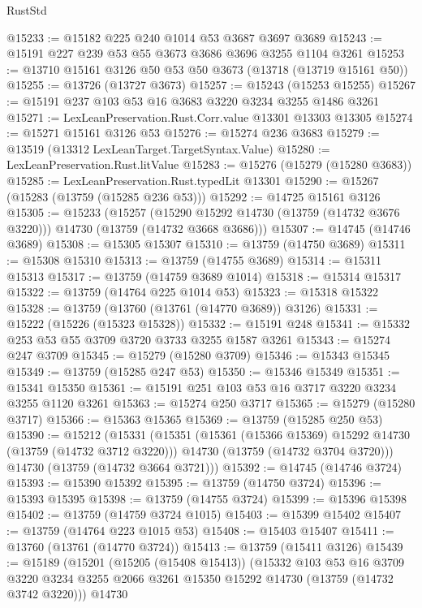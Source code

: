 \begin{lexlean}{RustStd}
\begin{coremodule}
@15233 := @15182 @225 @240 @1014 @53 @3687 @3697 @3689
@15243 := @15191 @227 @239 @53 @55 @3673 @3686 @3696 @3255 @1104 @3261
@15253 := @13710 @15161 @3126 @50 @53 @50 @3673 (@13718 (@13719 @15161 @50))
@15255 := @13726 (@13727 @3673)
@15257 := @15243 (@15253 @15255)
@15267 := @15191 @237 @103 @53 @16 @3683 @3220 @3234 @3255 @1486 @3261
@15271 := LexLeanPreservation.Rust.Corr.value @13301 @13303 @13305
@15274 := @15271 @15161 @3126 @53
@15276 := @15274 @236 @3683
@15279 := @13519 (@13312 LexLeanTarget.TargetSyntax.Value)
@15280 := LexLeanPreservation.Rust.litValue
@15283 := @15276 (@15279 (@15280 @3683))
@15285 := LexLeanPreservation.Rust.typedLit @13301
@15290 := @15267 (@15283 (@13759 (@15285 @236 @53)))
@15292 := @14725 @15161 @3126
@15305 := @15233
    (@15257
      (@15290 @15292 @14730 (@13759 (@14732 @3676 @3220)))
      @14730
      (@13759 (@14732 @3668 @3686)))
@15307 := @14745 (@14746 @3689)
@15308 := @15305 @15307
@15310 := @13759 (@14750 @3689)
@15311 := @15308 @15310
@15313 := @13759 (@14755 @3689)
@15314 := @15311 @15313
@15317 := @13759 (@14759 @3689 @1014)
@15318 := @15314 @15317
@15322 := @13759 (@14764 @225 @1014 @53)
@15323 := @15318 @15322
@15328 := @13759 (@13760 (@13761 (@14770 @3689)) @3126)
@15331 := @15222 (@15226 (@15323 @15328))
@15332 := @15191 @248
@15341 := @15332 @253 @53 @55 @3709 @3720 @3733 @3255 @1587 @3261
@15343 := @15274 @247 @3709
@15345 := @15279 (@15280 @3709)
@15346 := @15343 @15345
@15349 := @13759 (@15285 @247 @53)
@15350 := @15346 @15349
@15351 := @15341 @15350
@15361 := @15191 @251 @103 @53 @16 @3717 @3220 @3234 @3255 @1120 @3261
@15363 := @15274 @250 @3717
@15365 := @15279 (@15280 @3717)
@15366 := @15363 @15365
@15369 := @13759 (@15285 @250 @53)
@15390 := @15212
    (@15331
      (@15351
        (@15361 (@15366 @15369) @15292 @14730 (@13759 (@14732 @3712 @3220)))
        @14730
        (@13759 (@14732 @3704 @3720)))
      @14730
      (@13759 (@14732 @3664 @3721)))
@15392 := @14745 (@14746 @3724)
@15393 := @15390 @15392
@15395 := @13759 (@14750 @3724)
@15396 := @15393 @15395
@15398 := @13759 (@14755 @3724)
@15399 := @15396 @15398
@15402 := @13759 (@14759 @3724 @1015)
@15403 := @15399 @15402
@15407 := @13759 (@14764 @223 @1015 @53)
@15408 := @15403 @15407
@15411 := @13760 (@13761 (@14770 @3724))
@15413 := @13759 (@15411 @3126)
@15439 := @15189
    (@15201
      (@15205 (@15408 @15413))
      (@15332
        @103
        @53
        @16
        @3709
        @3220
        @3234
        @3255
        @2066
        @3261
        @15350
        @15292
        @14730
        (@13759 (@14732 @3742 @3220)))
      @14730

\end{coremodule}
\end{lexlean}
